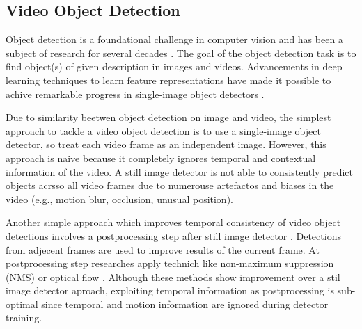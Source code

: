 

\subsection{Video Object Detection} \label{Background:VideoObjectDetection}


Object detection is a foundational challenge in computer vision and has been a subject of research for several decades \cite{fischlerRepresentationMatchingPictorial1973}. The goal of the object detection task is to find object(s) of given description in images and videos. Advancements in deep learning techniques to learn feature representations \cite{hintonReducingDimensionalityData2006, lecunDeepLearning2015} have made it possible to achive remarkable progress in single-image object detectors \cite{girshickRichFeatureHierarchies2014a}.


Due to similarity beetwen object detection on image and video, the simplest approach to tackle a video object detection is to use a single-image object detector, so treat each video frame as an independent image. However, this approach is naive because it completely ignores temporal and contextual information of the video. A still image detector is not able to consistently predict objects acrsso all video frames due to numerouse artefactos and biases in the video (e.g., motion blur, occlusion, unusual position).




Another simple approach which improves temporal consistency of video object detections involves a postprocessing step after still image detector \cite{hanSeqNMSVideoObject2016, kangTCNNTubeletsConvolutional2018, kangObjectDetectionVideo2016}. Detections from adjecent frames are used to improve results of the current frame. At postprocessing step researches apply technich like non-maximum suppression (NMS) \cite{hanSeqNMSVideoObject2016} or optical flow \cite{kangTCNNTubeletsConvolutional2018, kangObjectDetectionVideo2016}. Although these methods show improvement over a stil image detector aproach, exploiting temporal information as postprocessing is sub-optimal since temporal and motion information are ignored during detector training.


